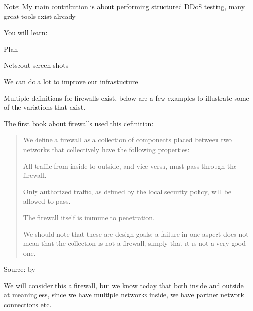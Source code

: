 \documentclass[Screen16to9,17pt]{foils}
\begin{document}
{}

{\small
Note: My main contribution is about performing structured DDoS testing, many great tools exist already}


You will learn:
\begin{list2}
\item
\end{list2}



Plan



Netscout screen shots


We can do a lot to improve our infrastucture



Multiple definitions for firewalls exist, below are a few examples to illustrate some of the variations that exist.

The first book about firewalls used this definition:

\begin{quote}
We define a firewall as a collection of components placed between two networks that collectively have
the following properties:
\begin{list2}
\item All traffic from inside to outside, and vice-versa, must pass through the firewall.
\item Only authorized traffic, as defined by the local security policy, will be allowed to pass.
\item The firewall itself is immune to penetration.
\end{list2}
We should note that these are design goals; a failure in one aspect does not mean that the collection
is not a firewall, simply that it is not a very good one.
\end{quote}

Source:  by \citeauthor{Cheswick94} \citeyear{Cheswick94}

We will consider this a firewall, but we know today that both inside and outside at meaningless, since we have multiple networks inside, we have partner network connections etc.
\end{document}
